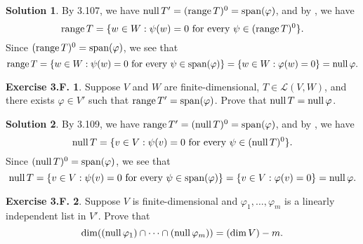 \documentclass[12pt]{article}
\theoremstyle{definition}
\theoremstyle{exercise}
\newtheorem{exercise}{Exercise 3.F.}
\theoremstyle{solution}
\newtheorem*{solution}{Solution}
\newcommand{\lmap}{\mathcal{L}}
\newcommand{\Span}{\text{span}}
\newcommand{\Null}{\text{null\,}}
\newcommand{\Range}{\text{range\,}}
\begin{document}
\begin{solution}
    By 3.107, we have \( \Null T' = (\Range T)^0 = \Span(\varphi) \), and by , we have
    \[
        \Range T = \{ w \in W : \psi(w) = 0 \text{ for every } \psi \in (\Range T)^0 \}.
    \]
    Since \( (\Range T)^0 = \Span(\varphi) \), we see that
    \[
        \Range T = \{ w \in W : \psi(w) = 0 \text{ for every } \psi \in \Span(\varphi) \} = \{ w \in W : \varphi(w) = 0 \} = \Null \varphi.
    \]
\end{solution}

\begin{exercise}
\label{ex:29}
    Suppose \( V \) and \( W \) are finite-dimensional, \( T \in \lmap(V, W) \), and there exists \( \varphi \in V' \) such that \( \Range T' = \Span(\varphi) \). Prove that \( \Null T = \Null \varphi \).
\end{exercise}

\begin{solution}
    By 3.109, we have \( \Range T' = (\Null T)^0 = \Span(\varphi) \), and by , we have
    \[
        \Null T = \{ v \in V : \psi(v) = 0 \text{ for every } \psi \in (\Null T)^0 \}.
    \]
    Since \( (\Null T)^0 = \Span(\varphi) \), we see that
    \[
        \Null T = \{ v \in V : \psi(v) = 0 \text{ for every } \psi \in \Span(\varphi) \} = \{ v \in V : \varphi(v) = 0 \} = \Null \varphi.
    \]
\end{solution}

\begin{exercise}
\label{ex:30}
    Suppose \( V \) is finite-dimensional and \( \varphi_1, \ldots, \varphi_m \) is a linearly independent list in \( V' \). Prove that
    \[
        \dim((\Null \varphi_1) \cap \cdots \cap (\Null \varphi_m)) = (\dim V) - m.
    \]
\end{exercise}
\end{document}
